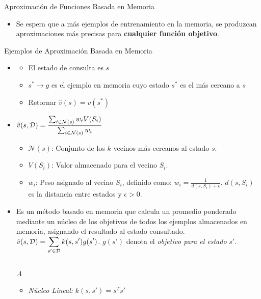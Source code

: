 \documentclass[10pt, envcountsect, handout, aspectratio=1610, hyperref={hypertexnames=true}]{beamer}
\begin{document}
\begin{frame}{Aproximación de Funciones Basada en Memoria}
\begin{itemize}
\begin{itemize}
				\item Se espera que a más ejemplos de entrenamiento en la memoria, se produzcan aproximaciones  más precisas para \textbf{cualquier función objetivo}.
				
			\end{itemize}
		\end{itemize}
	\end{frame}
	
\begin{frame}{Ejemplos de Aproximación Basada en Memoria }
	\begin{itemize}
		\item  {}
			\begin{itemize}
				\item El estado de consulta es \(s\)
				\item \(s^* \rightarrow g\) es el ejemplo en memoria cuyo estado \(s^*\) es el más cercano a \(s\)
				\item Retornar $\hat{v}(s)=v(s^*)$
			\end{itemize}
			
		\item {} $\displaystyle \hat{v}(s, \mathcal{D}) = \frac{\sum_{i \in \mathcal{N}(s)} w_i V(S_i)}{\sum_{i \in \mathcal{N}(s)} w_i}$
		\begin{itemize}
			\item \( \mathcal{N}(s) \): Conjunto de los \( k \) vecinos más cercanos al estado \( s \).  
			\item \( V(S_i) \): Valor almacenado para el vecino \( S_i \).  
			\item \( w_i \): Peso asignado al vecino \( S_i \), definido como: $w_i = \frac{1}{d(s, S_i) + \epsilon} $. \( d(s, S_i) \) es la distancia entre estados y  \( \epsilon  > 0\).
		\end{itemize}
		
		\item {} Es un método basado en memoria que calcula un promedio ponderado mediante un núcleo de los objetivos de todos los ejemplos almacenados en memoria, asignando el resultado al estado consultado.
		$\displaystyle \hat{v}(s, \mathcal{D}) = \sum_{s' \in \mathcal{D}} k(s, s') g(s')$.  \( g(s') \) denota el \textit{objetivo para el estado} \( s' \).
		
		\begin{columns}
			\begin{column}{.4\textwidth}
				\begin{itemize}
					\item \textit{Núcleo Lineal:}
					$
					k(s, s') = s^T s'
					$
					

\end{itemize}
\end{column}
\end{columns}
\end{itemize}
\end{frame}
\end{document}
